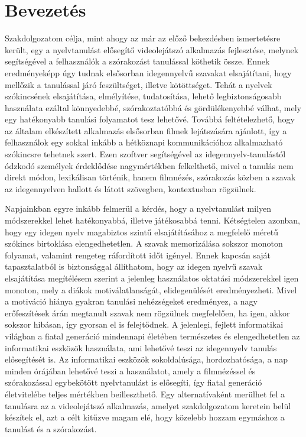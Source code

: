 \chapter*{Bevezetés}
\onehalfspace
Szakdolgozatom célja, mint ahogy az már az előző bekezdésben ismertetésre került, egy a nyelvtanulást elősegítő videolejátszó alkalmazás fejlesztése, melynek segítségével a felhasználók a szórakozást tanulással köthetik össze. Ennek eredményeképp úgy tudnak elsősorban idegennyelvű szavakat elsajátítani, hogy mellőzik a tanulással járó feszültséget, illetve kötöttséget. Tehát a nyelvek szókincsének elsajátítása, elmélyítése, tudatosítása, lehető legbiztonságosabb használata ezáltal könnyedebbé, szórakoztatóbbá és gördülékenyebbé válhat, mely egy hatékonyabb tanulási folyamatot tesz lehetővé. Továbbá feltételezhető, hogy az általam elkészített alkalmazás elsősorban filmek lejátszására ajánlott, így a felhasználok egy sokkal inkább a hétköznapi kommunikációhoz alkalmazható szókincsre tehetnek szert. Ezen szoftver segítségével az idegennyelv-tanulástól ódzkodó személyek érdeklődése nagymértékben felkelthető, mivel a tanulás nem direkt módon, lexikálisan történik, hanem filmnézés, szórakozás közben a szavak az idegennyelven hallott és látott szövegben, kontextusban rögzülnek. 

Napjainkban egyre inkább felmerül a kérdés, hogy a nyelvtanulást milyen módszerekkel lehet hatékonyabbá, illetve játékosabbá tenni. Kétségtelen azonban, hogy egy idegen nyelv magabiztos szintű elsajátításához a megfelelő méretű szókincs birtoklása elengedhetetlen. A szavak memorizálása sokszor monoton folyamat, valamint rengeteg ráfordított időt igényel. Ennek kapcsán saját tapasztalatból is biztonsággal állíthatom, hogy az idegen nyelvű szavak elsajátítása megítélésem szerint a jelenleg használatos oktatási módszerekkel igen monoton, mely a diákok motiválatlanságát, elidegenülését eredményezheti. Mivel a motiváció hiánya gyakran tanulási nehézségeket eredményez, a nagy erőfeszítések árán megtanult szavak nem rögzülnek megfelelően, ha igen, akkor sokszor hibásan, így gyorsan el is felejtődnek. A jelenlegi, fejlett informatikai világban a fiatal generáció mindennapi életében természetes és elengedhetetlen az informatikai eszközök használata, ami lehetővé teszi az idegennyelv tanulás elősegítését is. Az informatikai eszközök sokoldalúsága, hordozhatósága, a nap minden órájában lehetővé teszi a használatot, amely a filmnézéssel és szórakozással egybekötött nyelvtanulást is elősegíti, így fiatal generáció életvitelébe teljes mértékben beilleszthető.
 Egy alternatívaként merülhet fel a tanulásra az a videolejátszó alkalmazás, amelyet szakdolgozatom keretein belül készítek el, azt a célt kitűzve magam elé, hogy közelebb hozzam egymáshoz a tanulást és a szórakozást. 

